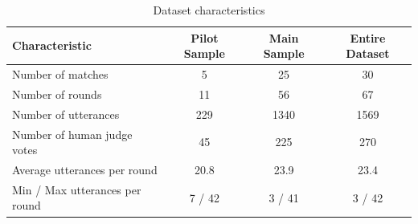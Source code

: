 \documentclass{article}
\begin{document}
\begin{table}[htbp]
\centering
\caption{Dataset characteristics}
\label{tab:dataset_characteristics}
\begin{tabular}{lccc}
\toprule
\textbf{Characteristic} & \textbf{Pilot Sample} & \textbf{Main Sample} & \textbf{Entire Dataset} \\
\midrule
Number of matches & 5 & 25 & 30 \\
Number of rounds & 11 & 56 & 67 \\
Number of utterances & 229 & 1340 & 1569 \\
Number of human judge votes & 45 & 225 & 270 \\
Average utterances per round & 20.8 & 23.9 & 23.4 \\
Min / Max utterances per round & 7 / 42 & 3 / 41 & 3 / 42 \\
\bottomrule
\end{tabular}
\end{table}
\end{document}
